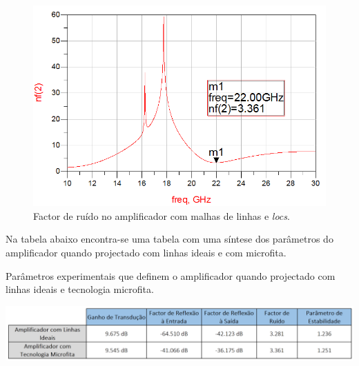 \documentclass[11pt]{article}
\numberwithin{equation}{section}
\begin{document}
\begin{figure}[H]
	\centering
	\includegraphics[keepaspectratio=true, scale=0.45]{exps/mf_noise}
	\vspace{-0.5em}
	\caption{Factor de ruído no amplificador com malhas de linhas e \textit{locs}.}
	\vspace{-0.8em}
	\label{fig:mf_noise}
\end{figure}

Na tabela abaixo encontra-se uma tabela com uma síntese dos parâmetros do amplificador quando projectado com linhas ideais e com microfita.

\begin{table}[H]
	\centering
	\caption{Parâmetros experimentais que definem o amplificador quando projectado com linhas ideais e tecnologia microfita.}
	\vspace{-1.5mm}
	\includegraphics[keepaspectratio=true, scale=0.45]{exps/comparacaoamp}
	\label{tab:comparacao}
\end{table}
\end{document}
